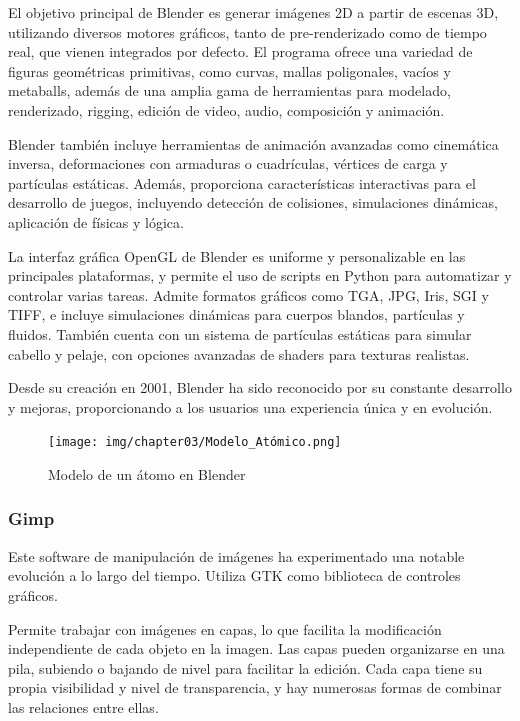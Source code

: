 El objetivo principal de Blender es generar imágenes 2D a partir de escenas 3D, utilizando diversos motores gráficos, tanto de pre-renderizado como de tiempo real, que vienen integrados por defecto. El programa ofrece una variedad de figuras geométricas primitivas, como curvas, mallas poligonales, vacíos y metaballs, además de una amplia gama de herramientas para modelado, renderizado, rigging, edición de video, audio, composición y animación.

Blender también incluye herramientas de animación avanzadas como cinemática inversa, deformaciones con armaduras o cuadrículas, vértices de carga y partículas estáticas. Además, proporciona características interactivas para el desarrollo de juegos, incluyendo detección de colisiones, simulaciones dinámicas, aplicación de físicas y lógica.

La interfaz gráfica OpenGL de Blender es uniforme y personalizable en las principales plataformas, y permite el uso de scripts en Python para automatizar y controlar varias tareas. Admite formatos gráficos como TGA, JPG, Iris, SGI y TIFF, e incluye simulaciones dinámicas para cuerpos blandos, partículas y fluidos. También cuenta con un sistema de partículas estáticas para simular cabello y pelaje, con opciones avanzadas de shaders para texturas realistas.

Desde su creación en 2001, Blender ha sido reconocido por su constante desarrollo y mejoras, proporcionando a los usuarios una experiencia única y en evolución.\\

\begin{figure}[thbp]
    \centering
    \texttt{[image: img/chapter03/Modelo\_Atómico.png]}
    \caption{Modelo de un átomo en Blender}
    \label{fig:atomo}
\end{figure}

\subsubsection{Gimp}
Este software de manipulación de imágenes ha experimentado una notable evolución a lo largo del tiempo. Utiliza GTK como biblioteca de controles gráficos.

Permite trabajar con imágenes en capas, lo que facilita la modificación independiente de cada objeto en la imagen. Las capas pueden organizarse en una pila, subiendo o bajando de nivel para facilitar la edición. Cada capa tiene su propia visibilidad y nivel de transparencia, y hay numerosas formas de combinar las relaciones entre ellas.

